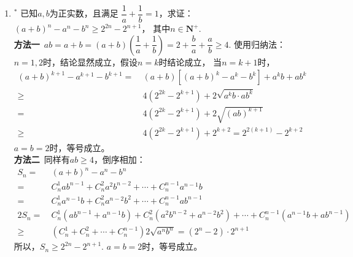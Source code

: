 \begin{enumerate}[label={【\textbf{例\thechapter.\arabic*}】},
 leftmargin=\inteval{\myenumleftmargin}pt,
 itemsep=\inteval{\myenumitempsep}pt,
 itemindent=\inteval{\myenumitemindent}pt]
\item $ ^* $ 已知$ a,b $为正实数，且满足
$ \dfrac{1}{a}+\dfrac{1}{b}=1 $，求证：
$ (a+b)^n-a^n-b^n\geq 2^{2n}-2^{n+1} $，
其中$ n \in \textbf{N}^+ $. \\
\textbf{方法一}\ $ ab=a+b=(a+b)\left(\dfrac{1}{a}+
\dfrac{1}{b}\right)=2+\dfrac{b}{a}+\dfrac{a}{b}\geq 4 $. 
使用归纳法：$n=1,2$时，结论显然成立，假设$n=k$时结论成立，
当$n=k+1$时，
\begin{align*}
    (a+b)^{k+1}-a^{k+1}-b^{k+1}
    =&\  (a+b)[(a+b)^k-a^k-b^k]+ a^kb+ab^k \\ 
    \geq &\ 4(2^{2k}-2^{k+1})+2\sqrt{a^kb\cdot ab^k} \\
       = &\ 4(2^{2k}-2^{k+1})+2\sqrt{(ab)^{k+1}} \\
    \geq &\ 4(2^{2k}-2^{k+1})+2^{k+2}=2^{2(k+1)}-2^{k+2}
\end{align*}
$a=b=2$时，等号成立。\\
\textbf{方法二}\ 同样有$ab\geq 4$，倒序相加：
\begin{align*}
    S_n =&\ (a+b)^n-a^n-b^n \\
    =&\ C_n^1ab^{n-1}+C_n^2a^2b^{n-2}+\cdots +C_n^{n-1}a^{n-1}b \\
    =&\ C_n^1a^{n-1}b+C_n^2a^{n-2}b^2+\cdots +C_n^{n-1}ab^{n-1} \\  
    2S_n=&\ C_n^1(ab^{n-1}+a^{n-1}b)+C_n^2(a^2b^{n-2}+a^{n-2}b^2)+\cdots 
    +C_n^{n-1}(a^{n-1}b+ab^{n-1}) \\ 
    \geq &\ (C_n^1+C_n^2+\cdots +C_n^{n-1}) 2\sqrt{a^nb^n}=(2^n-2)\cdot 2^{n+1}
\end{align*}
所以，$ S_n \geq 2^{2n}-2^{n+1} $. $a=b=2$时，等号成立。

\end{enumerate}

